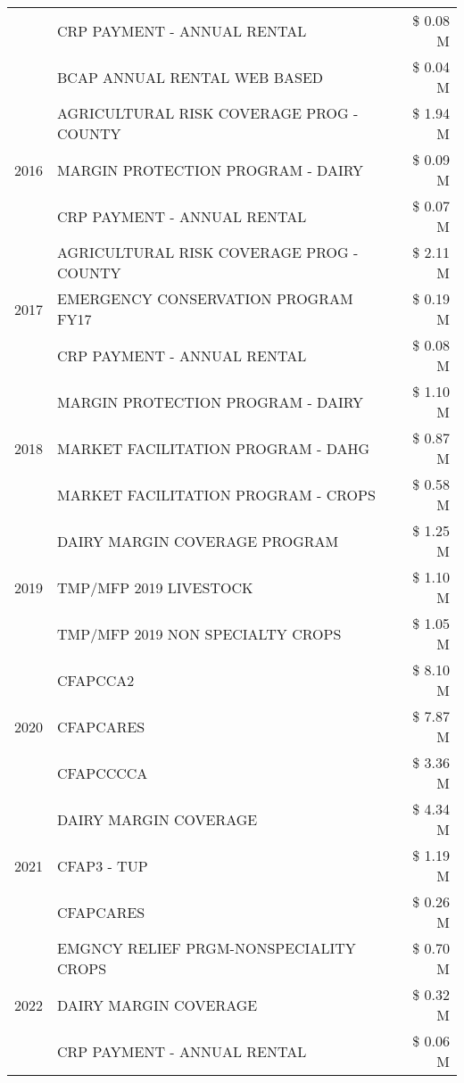 \begin{tabular}{llr}
 & CRP PAYMENT - ANNUAL RENTAL & \$ 0.08 M \\
 & BCAP ANNUAL RENTAL WEB BASED & \$ 0.04 M \\
\cline{1-3}
\multirow[t]{3}{*}{2016} & AGRICULTURAL RISK COVERAGE PROG - COUNTY & \$ 1.94 M \\
 & MARGIN PROTECTION PROGRAM - DAIRY & \$ 0.09 M \\
 & CRP PAYMENT - ANNUAL RENTAL & \$ 0.07 M \\
\cline{1-3}
\multirow[t]{3}{*}{2017} & AGRICULTURAL RISK COVERAGE PROG - COUNTY & \$ 2.11 M \\
 & EMERGENCY CONSERVATION PROGRAM FY17 & \$ 0.19 M \\
 & CRP PAYMENT - ANNUAL RENTAL & \$ 0.08 M \\
\cline{1-3}
\multirow[t]{3}{*}{2018} & MARGIN PROTECTION PROGRAM - DAIRY & \$ 1.10 M \\
 & MARKET FACILITATION PROGRAM - DAHG & \$ 0.87 M \\
 & MARKET FACILITATION PROGRAM - CROPS & \$ 0.58 M \\
\cline{1-3}
\multirow[t]{3}{*}{2019} & DAIRY MARGIN COVERAGE PROGRAM & \$ 1.25 M \\
 & TMP/MFP 2019 LIVESTOCK & \$ 1.10 M \\
 & TMP/MFP 2019 NON SPECIALTY CROPS & \$ 1.05 M \\
\cline{1-3}
\multirow[t]{3}{*}{2020} & CFAPCCA2 & \$ 8.10 M \\
 & CFAPCARES & \$ 7.87 M \\
 & CFAPCCCCA & \$ 3.36 M \\
\cline{1-3}
\multirow[t]{3}{*}{2021} & DAIRY MARGIN COVERAGE & \$ 4.34 M \\
 & CFAP3 - TUP & \$ 1.19 M \\
 & CFAPCARES & \$ 0.26 M \\
\cline{1-3}
\multirow[t]{3}{*}{2022} & EMGNCY RELIEF PRGM-NONSPECIALITY CROPS & \$ 0.70 M \\
 & DAIRY MARGIN COVERAGE & \$ 0.32 M \\
 & CRP PAYMENT - ANNUAL RENTAL & \$ 0.06 M \\
\cline{1-3}
\bottomrule
\end{tabular}
